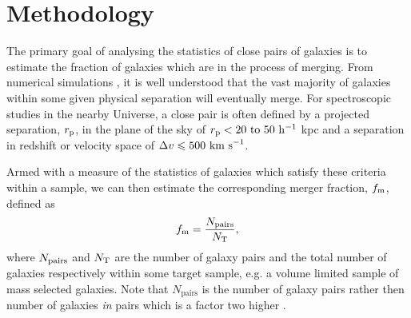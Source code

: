 %
%
%

\section{Methodology}\label{sec:method}
The primary goal of analysing the statistics of close pairs of galaxies is to estimate the fraction of galaxies which are in the process of merging. From numerical simulations \citep{Kitzbichler:2008gi}, it is well understood that the vast majority of galaxies within some given physical separation will eventually merge. For spectroscopic studies in the nearby Universe, a close pair is often defined by a projected separation, \(r_{\textup{p}} \), in the plane of the sky of \(r_{\textup{p}} < 20~\rm{to}~50~ h^{-1}\) kpc and a separation in redshift or velocity space of \( \Delta v \leq 500 \textup{ km s}^{-1}\).

Armed with a measure of the statistics of galaxies which satisfy these criteria within a sample, we can then estimate the corresponding merger fraction, $f_{\textup{m}}$, defined as
\begin{equation}
	f_{\textup{m}} = \frac{N_{\textup{pairs}}} {N_{\textup{T}}},
\end{equation}
where \(N_{\textup{pairs}}\) and \(N_{\textup{T}}\) are the number of galaxy pairs and the total number of galaxies respectively within some target sample, e.g. a volume limited sample of mass selected galaxies. Note that $N_{\text{pairs}}$ is the number of galaxy pairs rather then number of galaxies \emph{in} pairs which is a factor two higher \citep{Patton:2000kt}.

